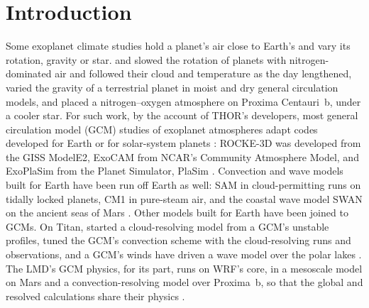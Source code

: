 \section{Introduction}

Some exoplanet climate studies hold a planet's air close to Earth's and vary its rotation, gravity or star.
\textcite{yang2014strong} and \textcite{way2018climates} slowed the rotation of planets with nitrogen-dominated
air and followed their cloud and temperature as the day lengthened, \textcite{thomson2019effects} varied the
gravity of a terrestrial planet in moist and dry general circulation models, and \textcite{boutle2017exploring}
placed a nitrogen--oxygen atmosphere on Proxima Centauri~b, under a cooler star. For such work, by the account of
THOR's developers, most general circulation model (GCM) studies of exoplanet atmospheres adapt codes developed for
Earth or for solar-system planets \autocite{deitrick2020thor}: ROCKE-3D was developed from the GISS ModelE2, ExoCAM
from NCAR's Community Atmosphere Model, and ExoPlaSim from the Planet Simulator, PlaSim
\autocite{way2017resolving,wolf2022exocam,paradise2022exoplasim}. Convection and wave models built for Earth have
been run off Earth as well: SAM in cloud-permitting runs on tidally locked planets, CM1 in pure-steam air, and the
coastal wave model SWAN on the ancient seas of Mars \autocite{yang2023cloud,tan2021convection,banfield2015winds}.
Other models built for Earth have been joined to GCMs. On Titan, \textcite{rafkin2022interaction} started a
cloud-resolving model from a GCM's unstable profiles, \textcite{battalio2022interaction} tuned the GCM's convection
scheme with the cloud-resolving runs and observations, and a GCM's winds have driven a wave model over the polar
lakes \autocite{detelich2026modeling}. The LMD's GCM physics, for its part, runs on WRF's core, in a mesoscale
model on Mars and a convection-resolving model over Proxima~b, so that the global and resolved calculations share
their physics \autocite{spiga2009new,lefevre2021convection}.

